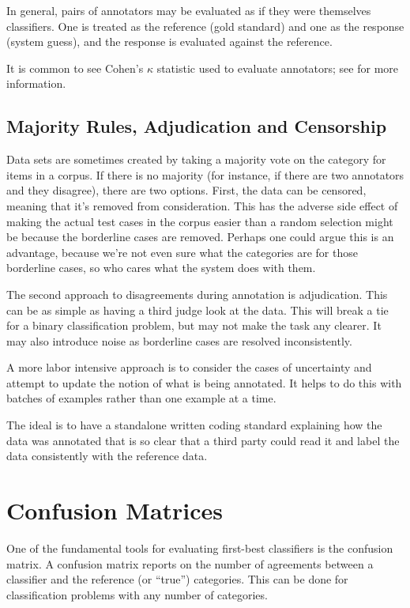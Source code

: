 In general, pairs of annotators may be evaluated as if they were
themselves classifiers.  One is treated as the reference (gold
standard) and one as the response (system guess), and the response
is evaluated against the reference.  

It is common to see Cohen's $\kappa$ statistic used to evaluate
annotators; see  for more information.


\subsection{Majority Rules, Adjudication and Censorship}

Data sets are sometimes created by taking a majority vote on the
category for items in a corpus.  If there is no majority (for
instance, if there are two annotators and they disagree), there are
two options.  First, the data can be censored, meaning that it's
removed from consideration.  This has the adverse side effect of
making the actual test cases in the corpus easier than a random
selection might be because the borderline cases are removed.  Perhaps
one could argue this is an advantage, because we're not even sure what
the categories are for those borderline cases, so who cares what the
system does with them.  

The second approach to disagreements during annotation is
adjudication.  This can be as simple as having a third judge look at
the data.  This will break a tie for a binary classification problem,
but may not make the task any clearer.  It may also introduce noise
as borderline cases are resolved inconsistently.

A more labor intensive approach is to consider the cases of
uncertainty and attempt to update the notion of what is being
annotated.  It helps to do this with batches of examples rather than
one example at a time.  

The ideal is to have a standalone written coding standard explaining
how the data was annotated that is so clear that a third party could
read it and label the data consistently with the reference data.  



\section{Confusion Matrices}\label{section:classifier-eval-confusion-matrix}

One of the fundamental tools for evaluating first-best classifiers is
the confusion matrix.  A confusion matrix reports on the number of
agreements between a classifier and the reference (or ``true'')
categories.  This can be done for classification problems with any
number of categories.

